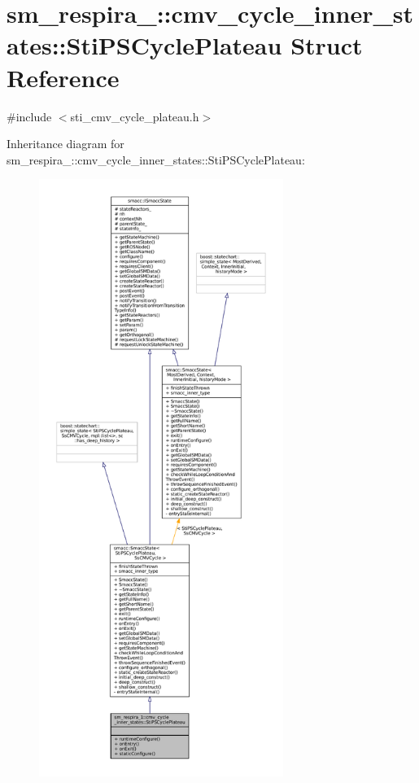 \hypertarget{structsm__respira__1_1_1cmv__cycle__inner__states_1_1StiPSCyclePlateau}{}\section{sm\+\_\+respira\+\_\+:\+:cmv\+\_\+cycle\+\_\+inner\+\_\+states\+:\+:Sti\+P\+S\+Cycle\+Plateau Struct Reference}
\label{structsm__respira__1_1_1cmv__cycle__inner__states_1_1StiPSCyclePlateau}


{\ttfamily \#include $<$sti\+\_\+cmv\+\_\+cycle\+\_\+plateau.\+h$>$}



Inheritance diagram for sm\+\_\+respira\+\_\+:\+:cmv\+\_\+cycle\+\_\+inner\+\_\+states\+:\+:Sti\+P\+S\+Cycle\+Plateau\+:
\nopagebreak
\begin{figure}[H]
\begin{center}
\leavevmode
\includegraphics[height=550pt]{structsm__respira__1_1_1cmv__cycle__inner__states_1_1StiPSCyclePlateau__inherit__graph}
\end{center}
\end{figure}


